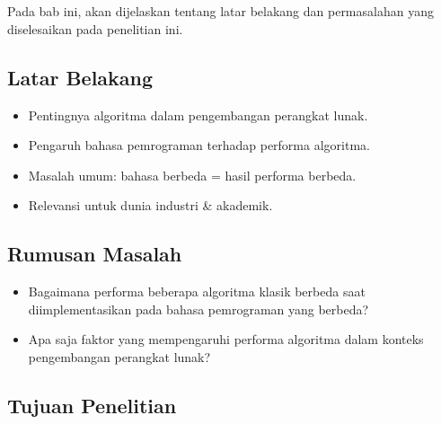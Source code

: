 \chapter{\babSatu}
\label{bab:1}
Pada bab ini, akan dijelaskan tentang latar belakang dan permasalahan yang diselesaikan pada penelitian ini.


\section{Latar Belakang}
\label{sec:latarBelakang}
\begin{itemize}
	\item Pentingnya algoritma dalam pengembangan perangkat lunak.
	\item Pengaruh bahasa pemrograman terhadap performa algoritma.
	\item Masalah umum: bahasa berbeda = hasil performa berbeda.
	\item Relevansi untuk dunia industri \& akademik.
\end{itemize}
\section{Rumusan Masalah}
\label{sec:rumusanMasalah}

\begin{itemize}
	\item Bagaimana performa beberapa algoritma klasik berbeda saat diimplementasikan pada bahasa pemrograman yang berbeda?
	\item Apa saja faktor yang mempengaruhi performa algoritma dalam konteks pengembangan perangkat lunak?
\end{itemize}

\section{Tujuan Penelitian}
\label{sec:tujuanPenelitian}

